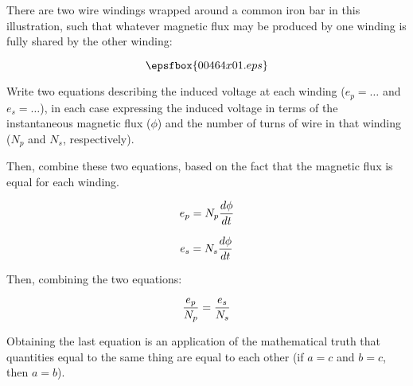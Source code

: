 

There are two wire windings wrapped around a common iron bar in this illustration, such that whatever magnetic flux may be produced by one winding is fully shared by the other winding:

$$\epsfbox{00464x01.eps}$$

Write two equations describing the induced voltage at each winding ($e_p = \dots$ and $e_s = \dots$), in each case expressing the induced voltage in terms of the instantaneous magnetic flux ($\phi$) and the number of turns of wire in that winding ($N_p$ and $N_s$, respectively).

Then, combine these two equations, based on the fact that the magnetic flux is equal for each winding.







$$e_p = N_p{d\phi \over dt}$$

$$e_s = N_s{d\phi \over dt}$$

\vskip 10pt

Then, combining the two equations:

$${e_p \over N_p} = {e_s \over N_s}$$







Obtaining the last equation is an application of the mathematical truth that quantities equal to the same thing are equal to each other (if $a = c$ and $b = c$, then $a = b$).  




